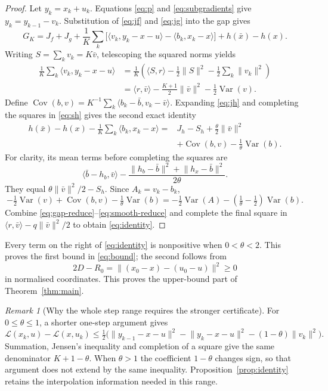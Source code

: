 \documentclass[11pt,a4paper]{article}
\theoremstyle{remark}\newtheorem{remark}[theorem]{Remark}
\DeclareMathOperator{\Var}{Var}
\newcommand{\ip}[2]{\langle #1,#2\rangle}
\newcommand{\norm}[1]{\lVert #1\rVert}
\begin{document}
\begin{proof}
Let $y_k=x_k+u_k$. Equations \eqref{eq:p} and \eqref{eq:subgradients} give $y_k=y_{k-1}-v_k$. Substitution of \eqref{eq:jf} and \eqref{eq:jg} into the gap gives
\begin{equation}\label{eq:gap-reduce}
G_K=J_f+J_g+\frac1K\sum_k\bigl[
\ip{v_k}{y_k-x-u}-\ip{b_k}{x_k-x}\bigr]+h(\bar x)-h(x).
\end{equation}
Writing $S=\sum_kv_k=K\bar v$, telescoping the squared norms yields
\begin{align}
\frac1K\sum_k\ip{v_k}{y_k-x-u}
&=\frac1K\left(\ip{S}{r}-\frac12\norm S^2-\frac12\sum_k\norm{v_k}^2\right)\nonumber\\
&=\ip r{\bar v}-\frac{K+1}{2}\norm{\bar v}^2-\frac12\Var(v).\label{eq:energy}
\end{align}
Define $\operatorname{Cov}(b,v)=K^{-1}\sum_k\ip{b_k-\bar b}{v_k-\bar v}$. Expanding \eqref{eq:jh} and completing the squares in \eqref{eq:sh} gives the second exact identity
\begin{align}
h(\bar x)-h(x)-\frac1K\sum_k\ip{b_k}{x_k-x}
={}&J_h-S_h+\frac\theta2\norm{\bar v}^2\nonumber\\
&+\operatorname{Cov}(b,v)-\frac1\theta\Var(b).\label{eq:smooth-reduce}
\end{align}
For clarity, its mean terms before completing the squares are
\[
\ip{\bar b-h_b}{\bar v}
-\frac{\norm{h_b-\bar b}^2+\norm{h_x-\bar b}^2}{2\theta}.
\]
They equal $\theta\norm{\bar v}^2/2-S_h$. Since $A_k=v_k-b_k$,
\[
-\tfrac12\Var(v)+\operatorname{Cov}(b,v)-\tfrac1\theta\Var(b)
=-\tfrac12\Var(A)-\left(\tfrac1\theta-\tfrac12\right)\Var(b).
\]
Combine \eqref{eq:gap-reduce}--\eqref{eq:smooth-reduce} and complete the final square in
$\ip r{\bar v}-q\norm{\bar v}^2/2$ to obtain \eqref{eq:identity}.
\end{proof}

Every term on the right of \eqref{eq:identity} is nonpositive when $0<\theta<2$. This proves the first bound in \eqref{eq:bound}; the second follows from
\[
2D-R_0=\norm{(x_0-x)-(u_0-u)}^2\ge0
\]
in normalised coordinates. This proves the upper-bound part of Theorem~\ref{thm:main}.

\begin{remark}[Why the whole step range requires the stronger certificate]
For $0\le\theta\le1$, a shorter one-step argument gives
\[
\mathcal L(x_k,u)-\mathcal L(x,u_k)
\le\tfrac12\bigl(\norm{y_{k-1}-x-u}^2-\norm{y_k-x-u}^2
-(1-\theta)\norm{v_k}^2\bigr).
\]
Summation, Jensen's inequality and completion of a square give the same denominator $K+1-\theta$. When $\theta>1$ the coefficient $1-\theta$ changes sign, so that argument does not extend by the same inequality. Proposition~\ref{prop:identity} retains the interpolation information needed in this range.
\end{remark}
\end{document}
